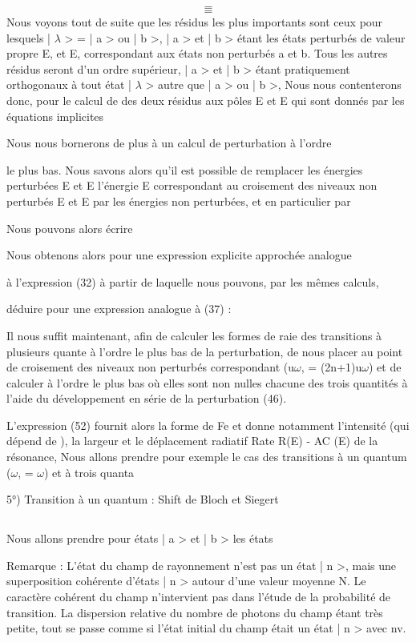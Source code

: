 
\[
\tag{51}=
\]
\[
\tag{52}=
\]
Nous voyons tout de suite que les résidus les plus importants sont ceux pour
lesquels | $\lambda$ > = | a > ou | b >, | a > et | b > étant les états perturbés de
valeur propre E, et E, correspondant aux états non perturbés a et b. Tous
les autres résidus seront d'un ordre supérieur, | a > et | b > étant pratiquement
orthogonaux à tout état | $\lambda$ > autre que | a > ou | b >, Nous nous contenterons donc,
pour le calcul de  des deux résidus aux pôles E et E
qui sont donnés par les équations implicites

Nous nous bornerons de plus à un calcul de perturbation à l'ordre

le plus bas. Nous savons alors qu'il est possible de remplacer les énergies
perturbées E et E
l'énergie E correspondant au croisement des niveaux non perturbés E et E
par les énergies non perturbées, et en particulier par

Nous pouvons alors écrire

Nous obtenons alors pour  une expression explicite approchée analogue

à l'expression (32) à partir de laquelle nous pouvons, par les mêmes calculs,

déduire pour  une expression analogue à (37) :

Il nous suffit maintenant, afin de calculer les formes de raie des transitions
à plusieurs quante à l'ordre le plus bas de la perturbation, de nous placer au
point de croisement des niveaux non perturbés correspondant (u$\omega$, = (2n+1)u$\omega$) et
de calculer à l'ordre le plus bas où elles sont non nulles chacune des trois
quantités  à l'aide du développement en série de la perturbation (46).

L'expression (52) fournit alors la forme de Fe et donne notamment l'intensité (qui dépend de ),
la largeur  et le déplacement radiatif Rate R(E) - AC (E) de la résonance, Nous allons prendre pour
exemple le cas des transitions à un quantum ($\omega$, = $\omega$) et à trois quanta

5°) Transition à un quantum : Shift de Bloch et Siegert
\subsection{}%
Nous allons prendre pour états | a > et | b > les états

Remarque : L'état du champ de rayonnement n'est pas un état | n >, mais une superposition cohérente d'états | n > autour d'une valeur moyenne N. Le caractère
cohérent du champ n'intervient pas dans l'étude de la probabilité de transition.
La dispersion relative du nombre de photons du champ  étant très
petite, tout se passe comme si l'état initial du champ était un état | n >
avec nv.

